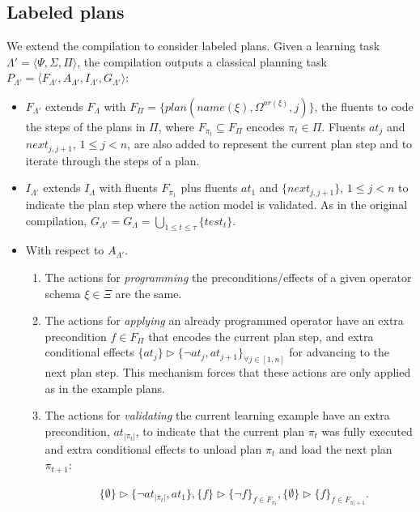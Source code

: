\documentclass[letterpaper]{article} %
\newcommand{\tup}[1]{{\langle #1 \rangle}}
\begin{document}
\subsection{Labeled plans}
We extend the compilation to consider labeled plans. Given a learning task $\Lambda'=\tup{\Psi,\Sigma,\Pi}$, the compilation outputs a classical planning task $P_{\Lambda'}=\tup{F_{\Lambda'},A_{\Lambda'},I_{\Lambda'},G_{\Lambda'}}$:
\begin{itemize}
\item $F_{\Lambda'}$ extends $F_{\Lambda}$ with $F_{\Pi}=\{plan(name(\xi),\Omega^{ar(\xi)},j)\}$, the fluents to code the steps of the plans in $\Pi$, where $F_{\pi_t}\subseteq F_{\Pi}$ encodes $\pi_t\in \Pi$. Fluents $at_j$ and $next_{j,j+1}$, {\small $1\leq j< n$}, are also added to represent the current plan step and to iterate through the steps of a plan.
\item $I_{\Lambda'}$ extends $I_{\Lambda}$ with fluents $F_{\pi_1}$ plus fluents $at_1$ and $\{next_{j,j+1}\}$, {\small $1\leq j<n$} to indicate the plan step where the action model is validated. As in the original compilation, $G_{\Lambda'}=G_{\Lambda}=\bigcup_{1\leq t\leq \tau}\{test_t\}$.
\item With respect to $A_{\Lambda'}$.
\begin{enumerate}
\item The actions for {\em programming} the preconditions/effects of a given operator schema $\xi\in\Xi$ are the same.
\item The actions for {\em applying} an already programmed operator have an extra precondition $f\in F_{\Pi}$ that encodes the current plan step, and extra conditional effects $\{at_{j}\}\rhd\{\neg at_{j},at_{j+1}\}_{\forall j\in [1,n]}$ for advancing to the next plan step. This mechanism forces that these actions are only applied as in the example plans.
\item The actions for {\em validating} the current learning example have an extra precondition, $at_{|\pi_t|}$, to indicate that the current plan $\pi_t$ was fully executed and extra conditional effects to unload plan $\pi_{t}$ and load the next plan $\pi_{t+1}$:
\begin{small}
\begin{align*}
&\{\emptyset\}\rhd\{\neg at_{|\pi_t|},at_1\}, \{f\}\rhd\{\neg f\}_{f\in F_{\pi_t}}, \{\emptyset\}\rhd\{f\}_{f\in F_{\pi_t+1}}.
\end{align*}
\end{small}
\end{enumerate}
\end{itemize}
\end{document}
